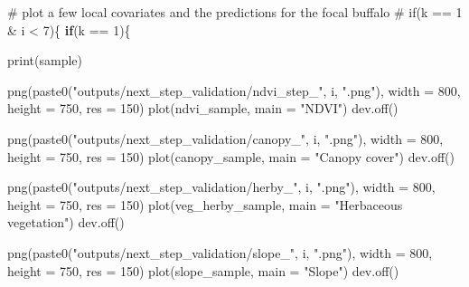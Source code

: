 \documentclass[
  letterpaper,
  DIV=11,
  numbers=noendperiod]{scrartcl}
\newenvironment{Shaded}{\begin{snugshade}}{\end{snugshade}}
\newcommand{\AttributeTok}[1]{\textcolor[rgb]{0.40,0.45,0.13}{#1}}
\newcommand{\CommentTok}[1]{\textcolor[rgb]{0.37,0.37,0.37}{#1}}
\newcommand{\ControlFlowTok}[1]{\textcolor[rgb]{0.00,0.23,0.31}{\textbf{#1}}}
\newcommand{\DecValTok}[1]{\textcolor[rgb]{0.68,0.00,0.00}{#1}}
\newcommand{\FunctionTok}[1]{\textcolor[rgb]{0.28,0.35,0.67}{#1}}
\newcommand{\NormalTok}[1]{\textcolor[rgb]{0.00,0.23,0.31}{#1}}
\newcommand{\SpecialCharTok}[1]{\textcolor[rgb]{0.37,0.37,0.37}{#1}}
\newcommand{\StringTok}[1]{\textcolor[rgb]{0.13,0.47,0.30}{#1}}
\begin{document}
\begin{Shaded}
\begin{Highlighting}[]
      \CommentTok{\# plot a few local covariates and the predictions for the focal buffalo}
      \CommentTok{\# if(k == 1 \& i \textless{} 7)\{}
      \ControlFlowTok{if}\NormalTok{(k }\SpecialCharTok{==} \DecValTok{1}\NormalTok{)\{}
        
        \FunctionTok{print}\NormalTok{(sample)}
        
        \FunctionTok{png}\NormalTok{(}\FunctionTok{paste0}\NormalTok{(}\StringTok{"outputs/next\_step\_validation/ndvi\_step\_"}\NormalTok{, i, }\StringTok{".png"}\NormalTok{),}
        \AttributeTok{width =} \DecValTok{800}\NormalTok{, }\AttributeTok{height =} \DecValTok{750}\NormalTok{, }\AttributeTok{res =} \DecValTok{150}\NormalTok{)}
        \FunctionTok{plot}\NormalTok{(ndvi\_sample, }\AttributeTok{main =} \StringTok{"NDVI"}\NormalTok{)}
        \FunctionTok{dev.off}\NormalTok{()}
        
        \FunctionTok{png}\NormalTok{(}\FunctionTok{paste0}\NormalTok{(}\StringTok{"outputs/next\_step\_validation/canopy\_"}\NormalTok{, i, }\StringTok{".png"}\NormalTok{),}
        \AttributeTok{width =} \DecValTok{800}\NormalTok{, }\AttributeTok{height =} \DecValTok{750}\NormalTok{, }\AttributeTok{res =} \DecValTok{150}\NormalTok{)}
        \FunctionTok{plot}\NormalTok{(canopy\_sample, }\AttributeTok{main =} \StringTok{"Canopy cover"}\NormalTok{)}
        \FunctionTok{dev.off}\NormalTok{()}
        
        \FunctionTok{png}\NormalTok{(}\FunctionTok{paste0}\NormalTok{(}\StringTok{"outputs/next\_step\_validation/herby\_"}\NormalTok{, i, }\StringTok{".png"}\NormalTok{),}
        \AttributeTok{width =} \DecValTok{800}\NormalTok{, }\AttributeTok{height =} \DecValTok{750}\NormalTok{, }\AttributeTok{res =} \DecValTok{150}\NormalTok{)}
        \FunctionTok{plot}\NormalTok{(veg\_herby\_sample, }\AttributeTok{main =} \StringTok{"Herbaceous vegetation"}\NormalTok{)}
        \FunctionTok{dev.off}\NormalTok{()}
        
        \FunctionTok{png}\NormalTok{(}\FunctionTok{paste0}\NormalTok{(}\StringTok{"outputs/next\_step\_validation/slope\_"}\NormalTok{, i, }\StringTok{".png"}\NormalTok{),}
        \AttributeTok{width =} \DecValTok{800}\NormalTok{, }\AttributeTok{height =} \DecValTok{750}\NormalTok{, }\AttributeTok{res =} \DecValTok{150}\NormalTok{)}
        \FunctionTok{plot}\NormalTok{(slope\_sample, }\AttributeTok{main =} \StringTok{"Slope"}\NormalTok{)}
        \FunctionTok{dev.off}\NormalTok{()}
        

\end{Highlighting}
\end{Shaded}
\end{document}
